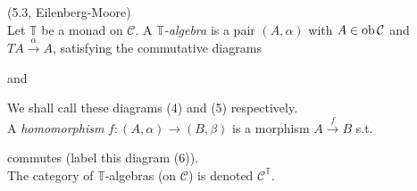 \documentclass[a4paper]{article}
\begin{document}
\begin{defi} (5.3, Eilenberg-Moore)\\
    Let $\mathbb{T}$ be a monad on $\mathcal{C}$. A \emph{$\mathbb{T}$-algebra} is a pair $(A,\alpha)$ with $A \in \operatorname{ob}\mathcal{C}$ and $TA \xrightarrow{\alpha} A$, satisfying the commutative diagrams

    and

    We shall call these diagrams (4) and (5) respectively.\\
    A \emph{homomorphism} $f:(A,\alpha) \to (B,\beta)$ is a morphism $A \xrightarrow{f} B$ s.t.
    commutes (label this diagram (6)).\\
    The category of $\mathbb{T}$-algebras (on $\mathcal{C}$) is denoted $\mathcal{C}^{\mathbb{T}}$.
\end{defi}
\end{document}
